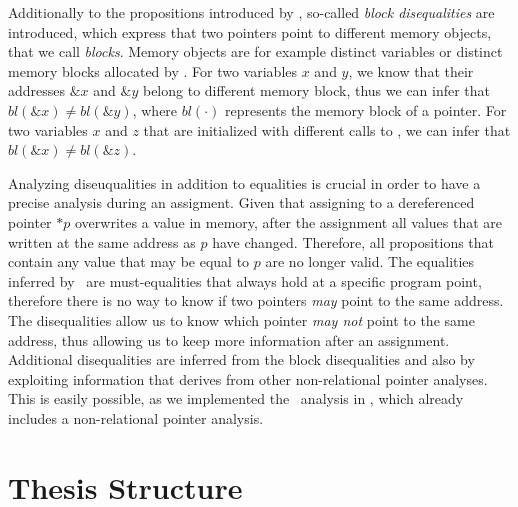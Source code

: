 Additionally to the propositions introduced by \textcite{2pointer}, so-called \emph{block disequalities}
are introduced, which express that two pointers point to different memory objects, that we call \emph{blocks}.
Memory objects are for example distinct variables or distinct memory blocks allocated by \malloc.
For two variables $x$ and $y$, we know that their addresses $\&x$ and $\&y$ belong to different memory block, thus we can infer that $bl(\&x) \neq bl(\&y)$, where $bl(\cdot)$ represents the memory block of a pointer.
For two variables $x$ and $z$ that are initialized with different calls to \malloc, we can infer that $bl(\&x) \neq bl(\&z)$.

Analyzing diseuqualities in addition to equalities is crucial in order to have a precise
analysis during an assigment.
Given that assigning to a dereferenced pointer $*p$ overwrites a value in memory, after the assignment
all values that are written at the same address as $p$ have changed.
Therefore, all propositions that contain any value that may be equal to $p$ are no longer valid.
The equalities inferred by \cpo\ are must-equalities that always hold at a specific program point,
therefore there is no way to know if two pointers \emph{may} point to the same address.
The disequalities allow us to know which pointer \emph{may not} point to the same address,
thus allowing us to keep more information after an assignment.
Additional disequalities are inferred from the block disequalities and also by
exploiting information that derives from other non-relational pointer analyses.
This is easily possible, as we implemented the \cpo\ analysis in \goblint, which already includes a non-relational pointer analysis.

\section{Thesis Structure}

